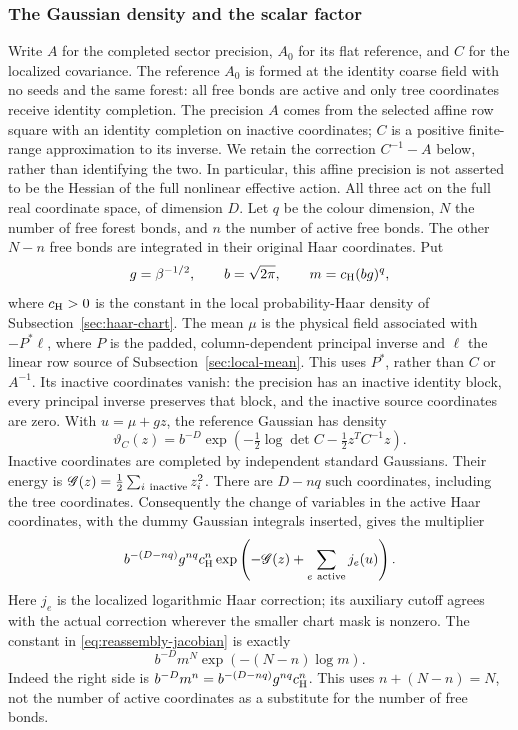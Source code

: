\subsubsection{The Gaussian density and the scalar factor}
Write $A$ for the completed sector precision, $A_0$ for its flat reference,
and $C$ for the localized covariance. The reference $A_0$ is formed
at the identity coarse field with no seeds and the same forest: all
free bonds are active and only tree coordinates receive identity
completion. The precision $A$ comes from the
selected affine row square with an identity completion on inactive
coordinates; $C$ is a positive finite-range approximation to its inverse.
We retain the correction $C^{-1}-A$ below, rather than identifying the two.
In particular, this affine precision is not asserted to be the Hessian of
the full nonlinear effective action. All three act on the full real
coordinate space, of dimension $D$. Let $q$ be the colour dimension,
$N$ the number of free forest bonds, and $n$ the number of active free
bonds. The other $N-n$ free bonds are integrated in their original Haar
coordinates. Put
\[
 g=\beta^{-1/2},\qquad b=\sqrt{2\pi},\qquad
 m=c_{\rm H}(bg)^q,
\]
where $c_{\rm H}>0$ is the constant in the local probability-Haar
density of Subsection~\ref{sec:haar-chart}. The mean $\mu$ is the physical
field associated with $-P^*\ell$, where $P$ is the padded,
column-dependent principal inverse and $\ell$ the linear row source
of Subsection~\ref{sec:local-mean}. This uses $P^*$, rather than $C$ or
$A^{-1}$. Its inactive coordinates vanish: the precision has an
inactive identity block, every principal inverse preserves that
block, and the inactive source coordinates are zero.
With $u=\mu+gz$, the reference
Gaussian has density
\begin{equation}\label{eq:reassembly-gaussian-density}
 \vartheta_C(z)=b^{-D}
       \exp\left(-\tfrac12\log\det C-\tfrac12 z^TC^{-1}z\right).
\end{equation}
Inactive coordinates are completed by independent standard Gaussians.
Their energy is $\mathscr G(z)=\frac12\sum_{i\ {\rm inactive}}z_i^2$.
There are $D-nq$ such coordinates, including the tree coordinates.
Consequently the change of variables in the active Haar coordinates,
with the dummy Gaussian integrals inserted, gives the multiplier
\begin{equation}\label{eq:reassembly-jacobian}
 b^{-(D-nq)}g^{nq}c_{\rm H}^{n}
       \exp\left(-\mathscr G(z)+\sum_{e\ {\rm active}}j_e(u)\right).
\end{equation}
Here $j_e$ is the localized logarithmic Haar correction; its auxiliary
cutoff agrees with the actual correction wherever the smaller chart mask
is nonzero. The constant in \eqref{eq:reassembly-jacobian} is exactly
\begin{equation}\label{eq:reassembly-count}
 b^{-D}m^N\exp(-(N-n)\log m).
\end{equation}
Indeed the right side is $b^{-D}m^n=b^{-(D-nq)}g^{nq}c_{\rm H}^n$.
This uses $n+(N-n)=N$, not the number of active coordinates as a
substitute for the number of free bonds.


